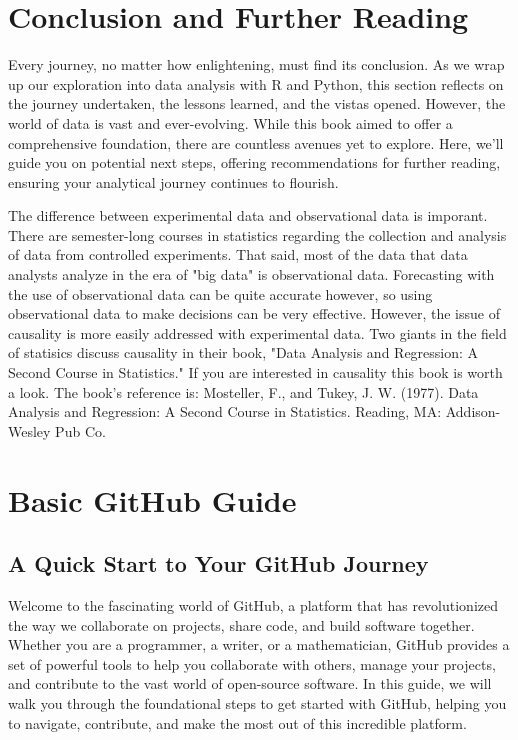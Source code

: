 \documentclass[a4paper,12pt]{book}
\begin{document}
\chapter*{Conclusion and Further Reading}
Every journey, no matter how enlightening, must find its conclusion. As we wrap up our exploration into data analysis with R and Python, this section reflects on the journey undertaken, the lessons learned, and the vistas opened. However, the world of data is vast and ever-evolving. While this book aimed to offer a comprehensive foundation, there are countless avenues yet to explore. Here, we'll guide you on potential next steps, offering recommendations for further reading, ensuring your analytical journey continues to flourish.

The difference between experimental data and observational data is imporant. There are semester-long courses in statistics regarding the collection and analysis of data from controlled experiments. That said, most of the data that data analysts analyze in the era of "big data" is observational data. Forecasting with the use of observational data can be quite accurate however, so using observational data to make decisions can be very effective. However, the issue of causality is more easily addressed with experimental data. Two giants in the field of statisics discuss causality in their book, "Data Analysis and Regression: A Second Course in Statistics." If you are interested in causality this book is worth a look. The book's reference is: Mosteller, F., and Tukey, J. W. (1977). Data Analysis and Regression: A Second Course in Statistics. Reading, MA: Addison-Wesley Pub Co.

\clearpage
{}
\appendix
\renewcommand{\thechapter}{\Roman{chapter}} %

\chapter{Basic GitHub Guide}
\section*{A Quick Start to Your GitHub Journey}

Welcome to the fascinating world of GitHub, a platform that has revolutionized the way we collaborate on projects, share code, and build software together. Whether you are a programmer, a writer, or a mathematician, GitHub provides a set of powerful tools to help you collaborate with others, manage your projects, and contribute to the vast world of open-source software. In this guide, we will walk you through the foundational steps to get started with GitHub, helping you to navigate, contribute, and make the most out of this incredible platform.
\end{document}
